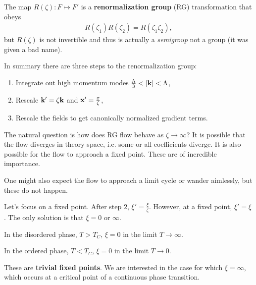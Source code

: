 
The map $R \left( \zeta \right) : F \mapsto F'$ is a \textbf{renormalization group} (RG) transformation that obeys
\begin{align}
    R \left( \zeta_1 \right) R \left( \zeta_2 \right) = R \left( \zeta_1 \zeta_2 \right) 
,\end{align}
but $R \left( \zeta \right) $ is not invertible and thus is actually a \textit{semigroup} not a group (it was given a bad name).

In summary there are three steps to the renormalization group:
\begin{enumerate}[label=\arabic*)]
    \item Integrate out high momentum modes $\frac{\Lambda}{3} < \left| \vb{k} \right| < \Lambda$,
    \item Rescale $\vb{k}' = \zeta \vb{k}$ and $\vb{x}' = \frac{x}{\zeta}$,
    \item Rescale the fields to get canonically normalized gradient terms.
\end{enumerate}

The natural question is how does RG flow behave as $\zeta \to \infty$? It is possible that the flow diverges in theory space, i.e. some or all coefficients diverge. It is also possible for the flow to approach a fixed point. These are of incredible importance.

One might also expect the flow to approach a limit cycle or wander aimlessly, but these do not happen.

Let's focus on a fixed point. After step $2$, $\xi' = \frac{\xi}{\zeta}$. However, at a fixed point, $\xi' = \xi$. The only solution is that $\xi = 0$ or $\infty$.

In the disordered phase, $T > T_C$, $\xi = 0$ in the limit $T \to \infty$.

In the ordered phase, $T < T_C$, $\xi = 0$ in the limit $T \to 0$. 


These are \textbf{trivial fixed points}. We are interested in the case for which $\xi = \infty$, which occurs at a critical point of a continuous phase transition.




